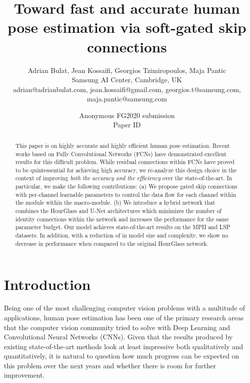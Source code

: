\documentclass[a4paper, 10pt, conference]{ieeeconf}      \usepackage{FG2020}
\title{\LARGE \bf
Toward fast and accurate human pose estimation via soft-gated skip connections
}
\author{\parbox{16cm}{\centering
    {\large Adrian Bulat, Jean Kossaifi, Georgios Tzimiropoulos, Maja Pantic}\\
    {\normalsize
    Samsung AI Center, Cambridge, UK\\
    adrian@adrianbulat.com, jean.kossaifi@gmail.com, georgios.t@samsung.com, maja.pantic@samsung.com}}
}
\begin{document}
\ifFGfinal
\thispagestyle{empty}
\pagestyle{empty}
\else
\author{Anonymous FG2020 submission\\ Paper ID \FGPaperID \\}
\pagestyle{plain}
\fi
\maketitle



\begin{abstract}

This paper is on highly accurate and highly efficient human pose estimation. Recent works based on Fully Convolutional Networks (FCNs) have demonstrated excellent results for this difficult problem. While residual connections within FCNs have proved to be quintessential for achieving high accuracy, we re-analyze this design choice in the context of improving \textit{both the accuracy and the efficiency} over the state-of-the-art. In particular, we make the following contributions: (a) We propose gated skip connections with per-channel learnable parameters to control the data flow for each channel within the module within the macro-module. (b) We introduce a hybrid network that combines the HourGlass and U-Net architectures which minimizes the number of identity connections within the network and increases the performance for the same parameter budget. Our model achieves state-of-the-art results on the MPII and LSP datasets. In addition, with a reduction of  in model size and complexity, we show no decrease in performance when compared to the original HourGlass network.

\end{abstract}


\section{Introduction}\label{sec:introduction}

Being one of the most challenging computer vision problems with a multitude of applications, human pose estimation has been one of the primary research areas that the computer vision community tried to solve with Deep Learning and Convolutional Neural Networks (CNNs). Given that the results produced by existing state-of-the-art methods look at least impressive both qualitatively and quantitatively, it is natural to question how much progress can be expected on this problem over the next years and whether there is room for further improvement. 
\end{document}

